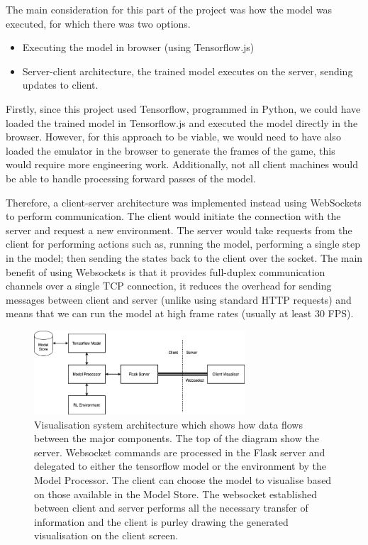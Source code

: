 The main consideration for this part of the project was how the model was executed, for which there was two options.

\begin{itemize}
	\item Executing the model in browser (using Tensorflow.js)
	\item Server-client architecture, the trained model executes on the server, sending updates to client.
\end{itemize}

Firstly, since this project used Tensorflow, programmed in Python, we could have loaded the trained model in Tensorflow.js and executed the model directly in the browser. However, for this approach to be viable, we would need to have also loaded the emulator in the browser to generate the frames of the game, this would require more engineering work. Additionally, not all client machines would be able to handle processing forward passes of the model.

Therefore, a client-server architecture was implemented instead using WebSockets to perform communication. The client would initiate the connection with the server and request a new environment. The server would take requests from the client for performing actions such as, running the model, performing a single step in the model; then sending the states back to the client over the socket. The main benefit of using Websockets is that it provides full-duplex communication channels over a single TCP connection, it reduces the overhead for sending messages between client and server (unlike using standard HTTP requests) and means that we can run the model at high frame rates (usually at least 30 FPS).

\begin{figure}[htbp]
	\centering
	\includegraphics[width=0.70\textwidth]{chapters/chapter4/images/VizSystem.png}
	\caption[Visualisation system architecture]{Visualisation system architecture which shows how data flows between the major components. The top of the diagram show the server. Websocket commands are processed in the Flask server and delegated to either the tensorflow model or the environment by the Model Processor. The client can choose the model to visualise based on those available in the Model Store. The websocket established between client and server performs all the necessary transfer of information and the client is purley drawing the generated visualisation on the client screen.
		\label{fig:viz-system-arch}
	}
\end{figure}


